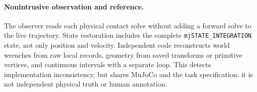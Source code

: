 \paragraph{Nonintrusive observation and reference.}
The observer reads each physical contact solve without adding a forward solve
to the live trajectory. State restoration includes the complete
\texttt{mjSTATE\_INTEGRATION} state, not only position and velocity. Independent
code reconstructs world wrenches from raw local records, geometry from saved
transforms or primitive vertices, and continuous intervals with a separate
loop. This detects implementation inconsistency, but shares MuJoCo and the
task specification: it is not independent physical truth or human annotation.
